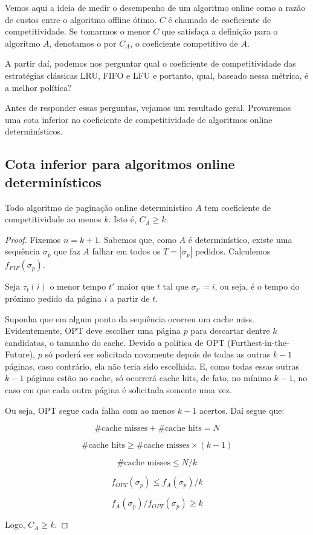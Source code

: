 \documentclass[a4paper,oneside,reqno,12pt]{amsart}
\begin{document}
Vemos aqui a ideia de medir o desempenho de um algoritmo online como a razão de custos entre o algoritmo offline ótimo. $C$ é chamado de coeficiente de competitividade. Se tomarmos o menor $C$ que satisfaça a definição para o algoritmo $A$, denotamos o por $C_A$, o coeficiente competitivo de $A$.

A partir daí, podemos nos perguntar qual o coeficiente de competitividade das estratégias clássicas LRU, FIFO e LFU e portanto, qual, baseado nessa métrica, é a melhor política?

Antes de responder essas perguntas, vejamos um resultado geral. Provaremos uma cota inferior no coeficiente de competitividade de algoritmos online determinísticos.

\subsection{Cota inferior para algoritmos online determinísticos}

\begin{theorem}
\label{teorema1}
Todo algoritmo de paginação online determinístico $A$ tem coeficiente de competitividade ao menos $k$. Isto é, $C_A \geqslant k$.
\end{theorem}

\begin{proof}

Fixemos $n = k + 1$. Sabemos que, como $A$ é determinístico, existe uma sequência $\sigma_p$ que faz $A$ falhar em todos os $T = |\sigma_p|$ pedidos. Calculemos $f_{FIF}(\sigma_p)$. 

Seja $\tau_t(i)$ o menor tempo $t'$ maior que $t$ tal que $\sigma_{t'} = i$, ou seja, é o tempo do próximo pedido da página $i$ a partir de $t$.



Suponha que em algum ponto da sequência ocorreu um cache miss. Evidentemente, OPT deve escolher uma página $p$ para descartar dentre $k$ candidatas, o tamanho do cache. Devido a política de OPT (Furthest-in-the-Future), $p$ só poderá ser solicitada novamente depois de todas as outras $k - 1$ páginas, caso contrário, ela não teria sido escolhida. E, como todas essas outras $k - 1$ páginas estão no cache, só ocorrerá cache hits, de fato, no mínimo $k - 1$, no caso em que cada outra página é solicitada somente uma vez.

Ou seja, OPT segue cada falha com ao menos $k-1$ acertos. Daí segue que:

\[\text{\# cache misses} + \text{\# cache hits} = N\]

\[ \text{\# cache hits} \geqslant \text{\# cache misses} \times (k-1)\]

\[\text{\# cache misses} \leqslant N/k\]

\[f_{OPT}(\sigma_p) \leqslant f_A(\sigma_p) / k\]

\[f_A(\sigma_p)/f_{OPT}(\sigma_p) \geqslant k\]

Logo, $C_A \geqslant k$.
\end{proof}
\end{document}
